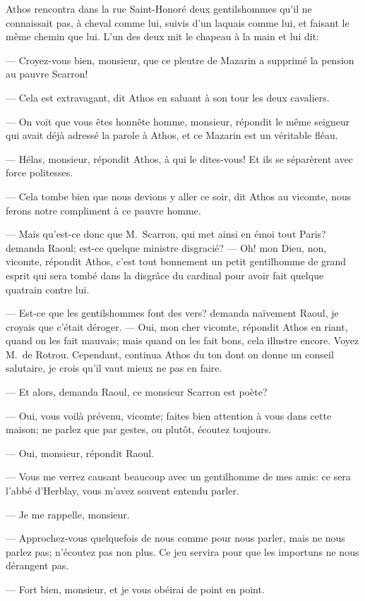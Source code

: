 Athos rencontra dans la rue Saint-Honoré deux gentilshommes qu'il ne connaissait pas, à cheval comme lui, suivis d'un laquais comme lui, et faisant le même chemin que lui. L'un des deux mit le chapeau à la main et lui dit:

— Croyez-vous bien, monsieur, que ce pleutre de Mazarin a supprimé la pension au pauvre Scarron!

— Cela est extravagant, dit Athos en saluant à son tour les deux cavaliers.

— On voit que vous êtes honnête homme, monsieur, répondit le même seigneur qui avait déjà adressé la parole à Athos, et ce Mazarin est un véritable fléau.

— Hélas, monsieur, répondit Athos, à qui le dites-vous! Et ils se séparèrent avec force politesses.

— Cela tombe bien que nous devions y aller ce soir, dit Athos au vicomte, nous ferons notre compliment à ce pauvre homme.

— Mais qu'est-ce donc que M.~Scarron, qui met ainsi en émoi tout Paris? demanda Raoul; est-ce quelque ministre disgracié?
— Oh! mon Dieu, non, vicomte, répondit Athos, c'est tout bonnement un petit gentilhomme de grand esprit qui sera tombé dans la disgrâce du cardinal pour avoir fait quelque quatrain contre lui.

— Est-ce que les gentilshommes font des vers? demanda naïvement Raoul, je croyais que c'était déroger.
— Oui, mon cher vicomte, répondit Athos en riant, quand on les fait mauvais; mais quand on les fait bons, cela illustre encore. Voyez M.~de Rotrou. Cependant, continua Athos du ton dont on donne un conseil salutaire, je crois qu'il vaut mieux ne pas en faire.

— Et alors, demanda Raoul, ce monsieur Scarron est poète?

— Oui, vous voilà prévenu, vicomte; faites bien attention à vous dans cette maison; ne parlez que par gestes, ou plutôt, écoutez toujours.

— Oui, monsieur, répondit Raoul.

— Vous me verrez causant beaucoup avec un gentilhomme de mes amis: ce sera l'abbé d'Herblay, vous m'avez souvent entendu parler.

— Je me rappelle, monsieur.

— Approchez-vous quelquefois de nous comme pour nous parler, mais ne nous parlez pas; n'écoutez pas non plus. Ce jeu servira pour que les importuns ne nous dérangent pas.

— Fort bien, monsieur, et je vous obéirai de point en point.

